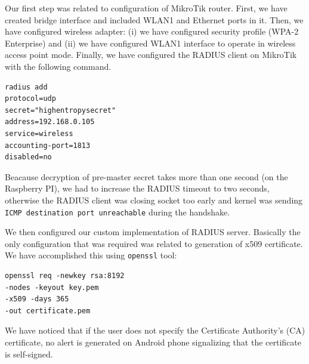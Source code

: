 Our first step was related to configuration of MikroTik router. First, we have
created bridge interface and included WLAN1 and Ethernet ports in it. Then,
we have configured wireless adapter: (i) we have configured security profile (WPA-2 
Enterprise) and (ii) we have configured WLAN1 interface to operate in wireless access 
point mode. Finally, we have configured the RADIUS client on MikroTik with the 
following command.

\begin{verbatim}
radius add 
protocol=udp 
secret="highentropysecret" 
address=192.168.0.105 
service=wireless 
accounting-port=1813 
disabled=no
\end{verbatim}

Beacause decryption of pre-master secret takes more than one second (on the Raspberry PI), 
we had to increase the RADIUS timeout to two seconds, otherwise the 
RADIUS client was closing socket too early and kernel was sending 
\texttt{ICMP destination port unreachable} during the handshake.

We then configured our custom implementation of RADIUS server. Basically the only configuration that 
was required was related to generation of x509 certificate. We have accomplished this using \texttt{openssl} tool:

\begin{verbatim}
openssl req -newkey rsa:8192 
-nodes -keyout key.pem 
-x509 -days 365 
-out certificate.pem
\end{verbatim}

We have noticed that if the user does not specify the Certificate Authority's (CA) certificate, 
no alert is generated on Android phone signalizing that the certificate is self-signed.
